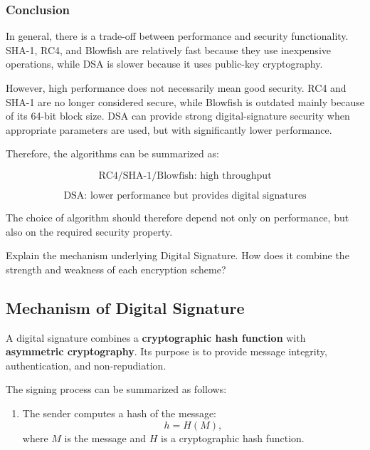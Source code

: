 \documentclass[a4paper, 10pt]{article}
\begin{document}
\begin{problem}
\begin{subproblems_alpha}
\begin{solution}
		      \subsubsection*{Conclusion}

		      In general, there is a trade-off between performance and security functionality. SHA-1, RC4, and Blowfish are relatively fast because they use inexpensive operations, while DSA is slower because it uses public-key cryptography.

		      However, high performance does not necessarily mean good security. RC4 and SHA-1 are no longer considered secure, while Blowfish is outdated mainly because of its 64-bit block size. DSA can provide strong digital-signature security when appropriate parameters are used, but with significantly lower performance.

		      Therefore, the algorithms can be summarized as:

		      \[
			      \text{RC4/SHA-1/Blowfish: high throughput}
		      \]

		      \[
			      \text{DSA: lower performance but provides digital signatures}
		      \]

		      The choice of algorithm should therefore depend not only on performance, but also on the required security property.
	      \end{solution}
	      \myspace[v][3][mm]

	\item Explain the mechanism underlying Digital Signature.
	      How does it combine the strength and weakness of each encryption scheme?
	      \myspace[v][3][mm]
	      \begin{solution}
		      \subsection*{Mechanism of Digital Signature}

		      A digital signature combines a \textbf{cryptographic hash function} with \textbf{asymmetric cryptography}.
		      Its purpose is to provide message integrity, authentication, and non-repudiation.

		      The signing process can be summarized as follows:

		      \begin{enumerate}
			      \item The sender computes a hash of the message:
			            \[
				            h = H(M),
			            \]
			            where $M$ is the message and $H$ is a cryptographic hash function.


\end{enumerate}
\end{solution}
\end{subproblems_alpha}
\end{problem}
\end{document}
